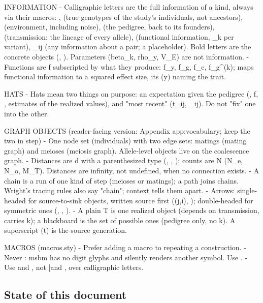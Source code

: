 \documentclass[12pt]{article}
\numberwithin{equation}{section}
\begin{document}
{INFORMATION
- Calligraphic letters are the full information of a kind, always via their macros: \Yinfo, \Ginfo (true genotypes of the study's individuals, not ancestors), \Einfo (environment, including noise), \Pinfo (the pedigree, back to its founders), \Tinfo (transmission: the lineage of every allele), \Binfo (functional information, \Binfo_k per variant), \Iinfo_{ij} (any information about a pair; a placeholder). Bold letters are the concrete objects (\bG, \bX). Parameters (beta_k, rho_y, V_E) are not information.
- Functions are f subscripted by what they produce: f_y, f_g, f_e, f_g^{(k)}; \fbeta maps functional information to a squared effect size, its (y) naming the trait.

HATS
- Hats mean two things on purpose: an expectation given the pedigree (\widehat\Theta, \widehat f, \widehat\pi, estimates of the realized values), and "most recent" (\hat t_{ij}, _{ij}). Do not "fix" one into the other.

GRAPH OBJECTS (reader-facing version: Appendix app:vocabulary; keep the two in step)
- One node set (individuals) with two edge sets: matings (mating graph) and meioses (meiosis graph). Allele-level objects live on the coalescence graph.
- Distances are d with a parenthesized type (\dmu, \dlin, \ddeg); counts are N (N_e, N_o, M_T). Distances are infinity, not undefined, when no connection exists.
- A chain is a run of one kind of step (meioses or matings); a path joins chains. Wright's tracing rules also say "chain"; context tells them apart.
- Arrows: single-headed for source-to-sink objects, written source first (\Lin(j,i), \Tchain); double-headed for symmetric ones (\Mu, \PedPath, \Cpath).
- A plain T is one realized object (depends on transmission, carries k); a blackboard  is the set of possible ones (pedigree only, no k). A superscript (t) is the source generation.

MACROS (macros.sty)
- Prefer adding a macro to repeating a construction.
- Never : msbm has no digit glyphs and silently renders another symbol. Use .
- Use \overline and \widehat, not \bar and \hat, over calligraphic letters.
}

\subsection{State of this document}
\end{document}
